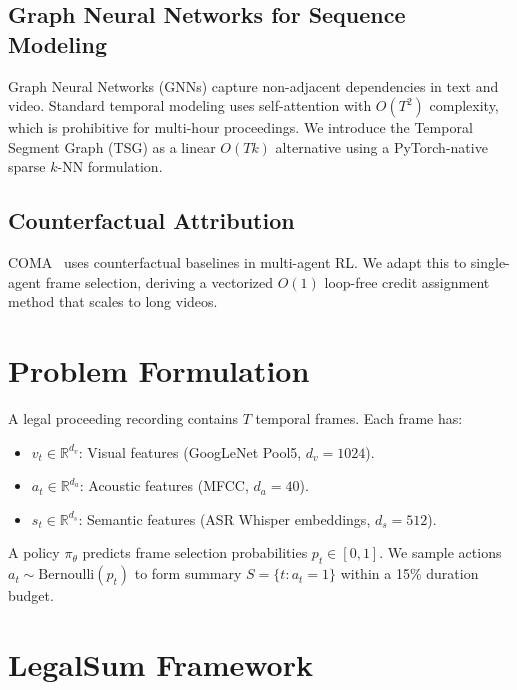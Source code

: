 \documentclass[letterpaper]{article} %
\begin{document}
\subsection{Graph Neural Networks for Sequence Modeling}
Graph Neural Networks (GNNs) capture non-adjacent dependencies in text and video. Standard temporal modeling uses self-attention with $O(T^2)$ complexity, which is prohibitive for multi-hour proceedings. We introduce the Temporal Segment Graph (TSG) as a linear $O(Tk)$ alternative using a PyTorch-native sparse $k$-NN formulation.

\subsection{Counterfactual Attribution}
COMA~\cite{foerster2018counterfactual} uses counterfactual baselines in multi-agent RL. We adapt this to single-agent frame selection, deriving a vectorized $O(1)$ loop-free credit assignment method that scales to long videos.

\section{Problem Formulation}
A legal proceeding recording contains $T$ temporal frames. Each frame has:
\begin{itemize}
    \item $v_t \in \mathbb{R}^{d_v}$: Visual features (GoogLeNet Pool5, $d_v = 1024$).
    \item $a_t \in \mathbb{R}^{d_a}$: Acoustic features (MFCC, $d_a = 40$).
    \item $s_t \in \mathbb{R}^{d_s}$: Semantic features (ASR Whisper embeddings, $d_s = 512$).
\end{itemize}
A policy $\pi_\theta$ predicts frame selection probabilities $p_t \in [0, 1]$. We sample actions $a_t \sim \text{Bernoulli}(p_t)$ to form summary $S = \{t : a_t = 1\}$ within a 15\% duration budget.

\section{LegalSum Framework}
\end{document}
